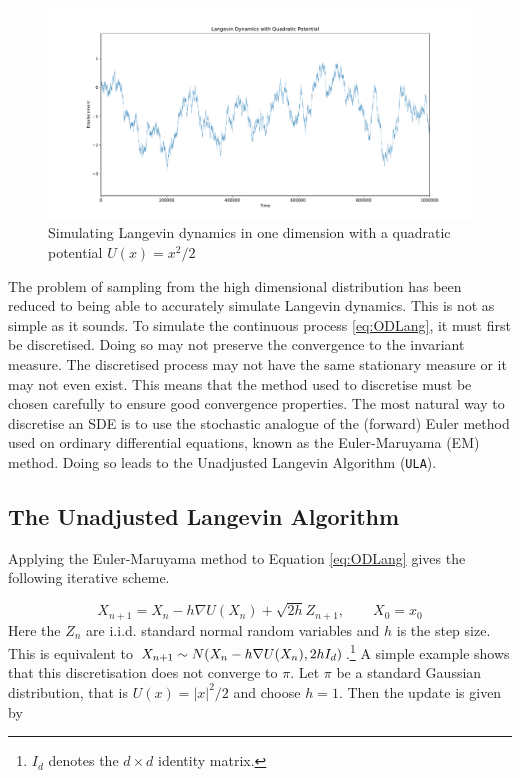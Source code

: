 \begin{figure}[ht]
	\centering
		\includegraphics[width=\linewidth]{quadraticLD.pdf}
	\caption{Simulating Langevin dynamics in one dimension with a quadratic potential \(U(x)=x^2/2\)}
	\label{fig:quadLD}
\end{figure}

The problem of sampling from the high dimensional distribution has been reduced to being able to accurately simulate Langevin dynamics. This is not as simple as it sounds. To simulate the continuous process  \eqref{eq:ODLang}, it must first be discretised. Doing so may not preserve the convergence to the invariant measure. The discretised process may not have the same stationary measure or it may not even exist. This means that the method used to discretise must be chosen carefully to ensure good convergence properties. The most natural way to discretise an SDE is to use the stochastic analogue of the (forward) Euler method used on ordinary differential equations, known as the Euler-Maruyama (EM) method. Doing so leads to the Unadjusted Langevin Algorithm (\texttt{ULA}).

\subsection{The Unadjusted Langevin Algorithm}
Applying the Euler-Maruyama method to Equation \eqref{eq:ODLang} gives the following iterative scheme.

\[X_{n+1} = X_n -h \nabla U(X_n) +\sqrt{2h} Z_{n+1},\qquad X_0= x_0 \]
Here the \(Z_n \) are i.i.d. standard normal random variables and \(h\) is the step size. This is equivalent to \(X_{n+1} \sim N(X_n - h\nabla U(X_n), 2h I_d )\).\footnote{\(I_d\) denotes the \(d \times d\) identity matrix.} A simple example shows that this discretisation does not converge to \(\pi\). Let \(\pi\) be a standard Gaussian distribution, that is \(U(x) = |x|^2/2 \) and choose \(h = 1\). Then the update is given by

